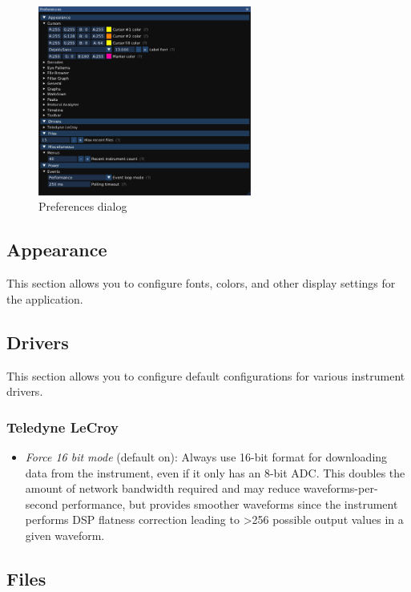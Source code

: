 \begin{figure}[H]
\centering
\includegraphics[width=7cm]{ng-images/dialog-preferences.png}
\caption{Preferences dialog}
\label{prefs}
\end{figure}

\subsection{Appearance}

This section allows you to configure fonts, colors, and other display settings for the application.


\subsection{Drivers}

This section allows you to configure default configurations for various instrument drivers.

\subsubsection{Teledyne LeCroy}

\begin{itemize}
\item \emph{Force 16 bit mode} (default on): Always use 16-bit format for downloading data from the instrument, even if
it only has an 8-bit ADC. This doubles the amount of network bandwidth required and may reduce waveforms-per-second
performance, but provides smoother waveforms since the instrument performs DSP flatness correction leading to >256
possible output values in a given waveform.
\end{itemize}

\subsection{Files}

